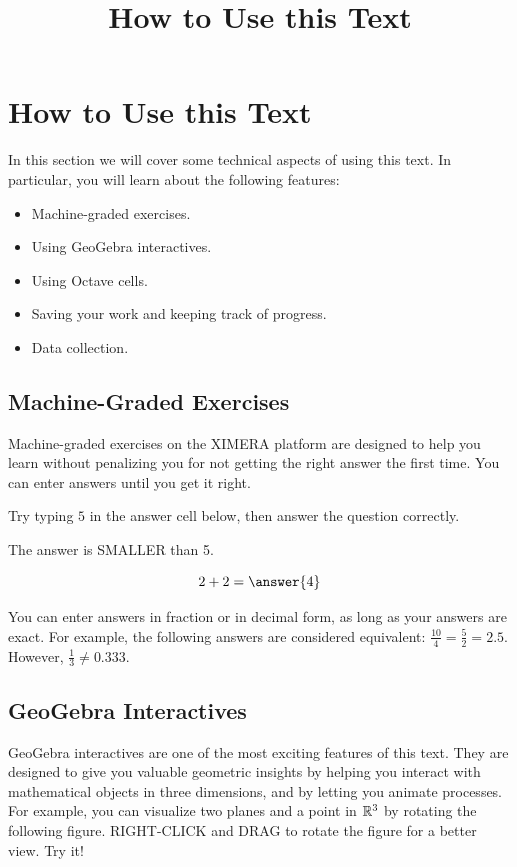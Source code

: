 \documentclass{ximera}
\title{How to Use this Text} \license{CC BY-NC-SA 4.0}
\begin{document}
\begin{abstract}
\end{abstract}
\maketitle



\section*{How to Use this Text}

In this section we will cover some technical aspects of using this text.  In particular, you will learn about the following features:
\begin{itemize}
    \item Machine-graded exercises.
    \item Using GeoGebra interactives.
    \item Using Octave cells.
    \item Saving your work and keeping track of progress.
    \item Data collection.
\end{itemize}

\subsection*{Machine-Graded Exercises}
Machine-graded exercises on the XIMERA platform are designed to help you learn without penalizing you for not getting the right answer the first time.  You can enter answers until you get it right.  
\begin{question}
Try typing $5$ in the answer cell below, then answer the question correctly.
\begin{hint} %
    The answer is SMALLER than 5.
\end{hint}
$$2+2=\answer{4}$$
\end{question}
You can enter answers in fraction or in decimal form, as long as your answers are exact.  For example, the following answers are considered equivalent: $\frac{10}{4}=\frac{5}{2}=2.5$.  However, $\frac{1}{3}\neq 0.333$.

\subsection*{GeoGebra Interactives}
GeoGebra interactives are one of the most exciting features of this text.  They are designed to give you valuable geometric insights by helping you interact with mathematical objects in three dimensions, and by letting you animate processes.  For example, you can visualize two planes and a point in $\mathbb{R}^3$ by rotating the following figure.  RIGHT-CLICK and DRAG to rotate the figure for a better view.  Try it!
\end{document}
